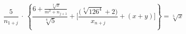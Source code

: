 \documentclass[11pt,a4paper]{book}
\begin{document}
\begin{center}


$$
\frac{5}{n_{1+j}}\:\cdot \:\left\{\frac{6+\frac{\sqrt[3]{x}}{m^2+n_{j+1}}}{\sqrt[4]{5}}+\Biggl[\frac{\bigl(\sqrt[4]{126^4}+2\bigr)}{x_{n+j}}+\left(x+y\right)\Biggr]\right\}=\sqrt[5]{x}
$$
\end{center}
\end{document}
